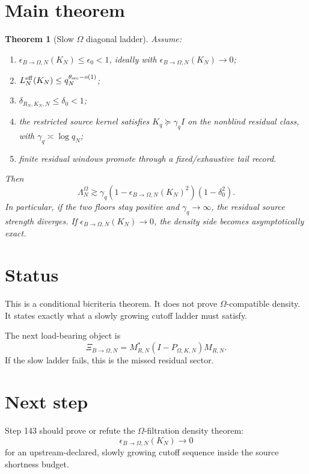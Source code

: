 \documentclass[11pt]{article}
\newtheorem{theorem}{Theorem}
\begin{document}
\section{Main theorem}
\begin{theorem}[Slow $\Omega$ diagonal ladder]
Assume:
\begin{enumerate}[label=(\roman*),leftmargin=*]
\item $\epsilon_{B\to\Omega,N}(K_N)\le \epsilon_0<1$, ideally with $\epsilon_{B\to\Omega,N}(K_N)\to0$;
\item $L_N^{\rm eff}(K_N)\le q_N^{\theta_{\rm src}-o(1)}$;
\item $\delta_{R_N,K_N,N}\le\delta_0<1$;
\item the restricted source kernel satisfies $K_q\succeq \gamma_q I$ on the nonblind residual class, with $\gamma_q\asymp\log q_N$;
\item finite residual windows promote through a fixed/exhaustive tail record.
\end{enumerate}
Then
\[
\Lambda_N^\Omega\gtrsim \gamma_q(1-\epsilon_{B\to\Omega,N}(K_N)^2)(1-\delta_0^2).
\]
In particular, if the two floors stay positive and $\gamma_q\to\infty$, the residual source strength diverges. If $\epsilon_{B\to\Omega,N}(K_N)\to0$, the density side becomes asymptotically exact.
\end{theorem}

\section{Status}
This is a conditional bicriteria theorem. It does not prove $\Omega$-compatible density. It states exactly what a slowly growing cutoff ladder must satisfy.

The next load-bearing object is
\[
\Xi_{B\to\Omega,N}=M_{R,N}^*(I-P_{\Omega,K,N})M_{R,N}.
\]
If the slow ladder fails, this is the missed residual sector.

\section{Next step}
Step 143 should prove or refute the $\Omega$-filtration density theorem:
\[
\epsilon_{B\to\Omega,N}(K_N)\to0
\]
for an upstream-declared, slowly growing cutoff sequence inside the source shortness budget.
\end{document}

